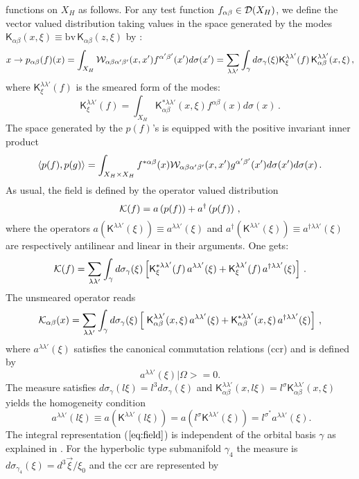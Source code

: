 \documentclass[a4paper,11pt,showpacs,preprintnumbers]{revtex4}
\def\K{\textsf{K}}
\begin{document}
functions on $X_{H}$ as follows. For any test function $f_{\alpha
\beta}\in {\cal D}(X_H)$, we define the vector valued distribution
taking values in the space generated by the modes
$\K_{\alpha\beta}(x,\xi)\equiv \mbox{bv}\,\K_{\alpha\beta}(z,\xi)$
by :
\begin{equation}
x\rightarrow p_{\alpha\beta}(f)(x)=\int_{X_{H}} {\cal
W}_{\alpha\beta\alpha'\beta'}(x,x')
f^{\alpha'\beta'}(x')d\sigma(x')=\sum_{\lambda\lambda'}\int_{\gamma}d\sigma_{\gamma}(\xi)
{\K}^{\lambda\lambda'}_{\xi}(f)\,{\K}_{\alpha\beta}^{\lambda\lambda'}(x,\xi)\,,
\end{equation}
where $\K^{\lambda\lambda'}_{\xi}(f)$ is the smeared form of the
modes:
\begin{equation}
{\K}^{\lambda\lambda'}_{\xi}(f)=\int_{X_{H}}{\K}_{\alpha\beta}^{*\lambda\lambda'}(x,\xi)f^{\alpha\beta}(x)d\sigma(x)\,.
\end{equation}
The space generated by the $p(f)$'s is equipped with the positive
invariant inner product
\begin{equation}
\langle p(f),p(g)\rangle=\int_{X_{H}\times X_{H}}
f^{*\alpha\beta}(x){\cal W}_{\alpha\beta\alpha'\beta'}(x,x')
g^{\alpha'\beta'}(x')d\sigma(x')d\sigma(x)\,.
\end{equation}
As usual, the field is defined by the operator valued distribution
\begin{equation}
{\cal K}(f)=a\left(p(f)\right)+a^{\dagger}\left(p(f)\right)\,,
\end{equation}
where the operators $a(\K^{\lambda\lambda'}(\xi)) \equiv
a^{\lambda\lambda'}(\xi)$ and
$a^{\dagger}(\K^{\lambda\lambda'}(\xi)) \equiv
a^{\dagger\lambda\lambda'}(\xi)$ are respectively antilinear and
linear in their arguments. One gets:
\begin{equation}
{\cal
K}(f)=\sum_{\lambda\lambda'}\int_{\gamma}d\sigma_{\gamma}(\xi)
\left[\K^{*\lambda\lambda'}_{\xi}(f)\,a^{\lambda\lambda'}(\xi)
+\K^{\lambda\lambda'}_{\xi}(f)\,a^{\dagger\lambda\lambda'}(\xi)\right]\,.
\end{equation}
The unsmeared operator reads
\begin{equation}\label{eq:field}
{\cal K}_{\alpha\beta}(x)= \sum_{\lambda \lambda'}\int_{\gamma}
d\sigma_{\gamma}(\xi) \left[ \;{\cal
\K}_{\alpha\beta}^{\lambda\lambda'}(x,\xi)\,
a^{\lambda\lambda'}(\xi) +{\cal
\K}_{\alpha\beta}^{*\lambda\lambda'} (x,\xi)\,
a^{\dagger\lambda\lambda'}(\xi)\right]\,,
\end{equation}
where $a^{\lambda\lambda'}(\xi)$ satisfies the canonical
commutation relations (ccr) and is defined by
$$a^{\lambda\lambda'}(\xi)|\Omega>=0.$$
The measure satisfies
$d\sigma_{\gamma}(l\xi)=l^{3}d\sigma_{\gamma}(\xi)$ and
${\K}^{\lambda\lambda'}_{\alpha\beta}(x,l
\xi)=l^{\sigma}{\K}^{\lambda\lambda'}_{\alpha\beta}(x,\xi)$ yields
the homogeneity condition
$$ \;a^{\lambda\lambda'}(l \xi)\equiv a(\K^{\lambda\lambda'}(l\xi))=a(l^{\sigma}\K^{\lambda\lambda'}(\xi))
=l ^{\sigma^{*}}a^{\lambda\lambda'}(\xi).$$ The integral
representation ($\ref{eq:field}$) is independent of the orbital
basis $\gamma$ as explained in \cite{brmo}.  For the hyperbolic
type submanifold $\gamma_{4}$ the measure is
$d\sigma_{\gamma_{4}}(\xi)=d^{3}\vec{\xi}/\xi_{0}$ and the ccr are
represented by
\end{document}
